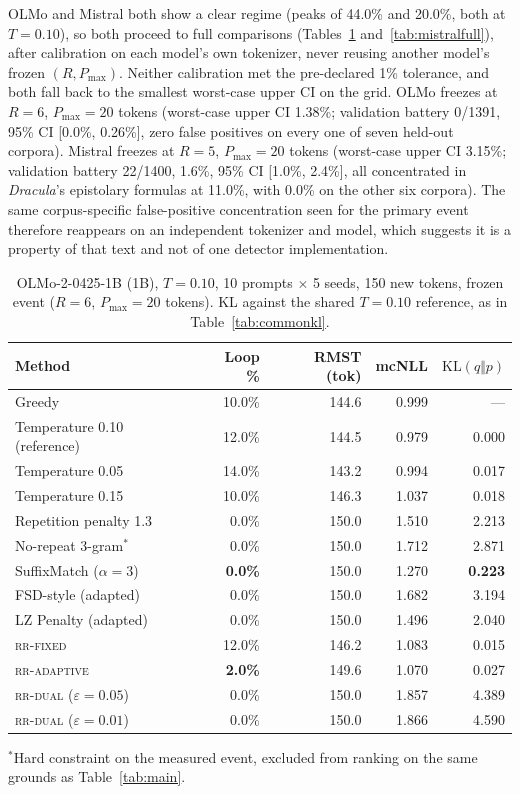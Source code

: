 \documentclass[11pt]{article}
\newcommand{\KL}{\mathrm{KL}}
\begin{document}
OLMo and Mistral both show a clear regime (peaks of 44.0\% and 20.0\%, both at $T{=}0.10$), so both proceed to full comparisons (Tables~\ref{tab:olmofull} and~\ref{tab:mistralfull}), after calibration on each model's own tokenizer, never reusing another model's frozen $(R,P_{\max})$. Neither calibration met the pre-declared 1\% tolerance, and both fall back to the smallest worst-case upper CI on the grid. OLMo freezes at $R{=}6$, $P_{\max}{=}20$ tokens (worst-case upper CI 1.38\%; validation battery 0/1391, 95\% CI [0.0\%, 0.26\%], zero false positives on every one of seven held-out corpora). Mistral freezes at $R{=}5$, $P_{\max}{=}20$ tokens (worst-case upper CI 3.15\%; validation battery 22/1400, 1.6\%, 95\% CI [1.0\%, 2.4\%], all concentrated in \emph{Dracula}'s epistolary formulas at 11.0\%, with 0.0\% on the other six corpora). The same corpus-specific false-positive concentration seen for the primary event therefore reappears on an independent tokenizer and model, which suggests it is a property of that text and not of one detector implementation.

\begin{table}[ht]
\centering
\caption{OLMo-2-0425-1B (1B), $T{=}0.10$, 10 prompts $\times$ 5 seeds, 150 new tokens, frozen event ($R{=}6$, $P_{\max}{=}20$ tokens). KL against the shared $T{=}0.10$ reference, as in Table~\ref{tab:commonkl}.}
\label{tab:olmofull}
\begin{tabular}{@{}lrrrr@{}}
\toprule
Method & Loop \% & RMST (tok) & mcNLL & $\KL(q\Vert p)$ \\
\midrule
Greedy                      & 10.0\% & 144.6 & 0.999 & --- \\
Temperature 0.10 (reference) & 12.0\% & 144.5 & 0.979 & 0.000 \\
Temperature 0.05             & 14.0\% & 143.2 & 0.994 & 0.017 \\
Temperature 0.15             & 10.0\% & 146.3 & 1.037 & 0.018 \\
Repetition penalty 1.3        & 0.0\%  & 150.0 & 1.510 & 2.213 \\
No-repeat 3-gram$^{*}$       & 0.0\%  & 150.0 & 1.712 & 2.871 \\
SuffixMatch ($\alpha{=}3$)    & \textbf{0.0\%}  & 150.0 & 1.270 & \textbf{0.223} \\
FSD-style (adapted)          & 0.0\%  & 150.0 & 1.682 & 3.194 \\
LZ Penalty (adapted)        & 0.0\%  & 150.0 & 1.496 & 2.040 \\
\textsc{rr-fixed}             & 12.0\% & 146.2 & 1.083 & 0.015 \\
\textsc{rr-adaptive}          & \textbf{2.0\%}  & 149.6 & 1.070 & 0.027 \\
\textsc{rr-dual} ($\varepsilon{=}0.05$) & 0.0\% & 150.0 & 1.857 & 4.389 \\
\textsc{rr-dual} ($\varepsilon{=}0.01$) & 0.0\% & 150.0 & 1.866 & 4.590 \\
\bottomrule
\end{tabular}

\vspace{4pt}
{\footnotesize $^{*}$Hard constraint on the measured event, excluded from ranking on the same grounds as Table~\ref{tab:main}.}
\end{table}
\end{document}
